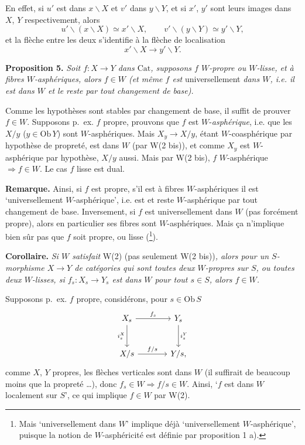 \documentclass[11pt]{article}
\newcommand{\printedpage}[1]{\marginpar{\footnotesize p.~#1}}
\newcommand{\msp}[1]{\marginpar{\footnotesize [#1]}}
\newcommand{\Cat}{\mathrm{Cat}}
\newcommand{\Ob}{\mathrm{Ob}}
\begin{document}
\printedpage{24}
En effet, si $u'$ est dans $x\backslash X$ et $v'$ dans $y\backslash Y$, et si $x'$, $y'$ sont leurs images dans $X$, $Y$ respectivement, alors
\[
u'\backslash(x\backslash X)\simeq x'\backslash X,\qquad v'\backslash(y\backslash Y)\simeq y'\backslash Y,
\]
et la flèche entre les deux s'identifie à la flèche de localisation
\[
x'\backslash X\longrightarrow y'\backslash Y.
\]

\textbf{Proposition 5.} \textit{Soit $f : X\longrightarrow Y$ dans $\Cat$, supposons $f$ $W$-propre ou $W$-lisse, et à fibres $W$-asphériques, alors $f\in W$ (et même $f$ est} \textup{universellement} \textit{dans $W$, i.e. il est dans $W$ et le reste par tout changement de base).}

\leavevmode\msp{page 30}Comme les hypothèses sont stables par changement de base, il suffit de prouver $f\in W$. Supposons p.~ex. $f$ propre, prouvons que $f$ est $W$-\textit{asphérique}, i.e. que les $X/y$ ($y\in\Ob\,Y$) sont $W$-asphériques. Mais $X_y\longrightarrow X/y$, étant $W$-coasphérique par hypothèse de propreté, est dans $W$ (par W(2 bis)), et comme $X_y$ est $W$-asphérique par hypothèse, $X/y$ aussi. Mais par W(2 bis), $f$ $W$-asphérique $\Longrightarrow f\in W$. Le cas $f$ lisse est dual.

\textbf{Remarque.} Ainsi, si $f$ est propre, s'il est à fibres $W$-asphériques il est `universellement $W$-asphérique', i.e. est et reste $W$-asphérique par tout changement de base. Inversement, si $f$ est universellement dans $W$ (pas forcément propre), alors en particulier ses fibres sont $W$-asphériques. Mais ça n'implique bien sûr pas que $f$ soit propre, ou lisse (\footnote[44]{Mais `universellement dans $W$' implique déjà `universellement $W$-asphérique', puisque la notion de $W$-asphéricité est définie par proposition 1 a).}).

\textbf{Corollaire.} \textit{Si $W$ satisfait} \textup{W(2) (pas seulement W(2 bis))}\textit{, alors pour un $S$-morphisme $X\longrightarrow Y$ de catégories qui sont toutes deux $W$-propres sur $S$, ou toutes deux $W$-lisses, si $f_s : X_s\longrightarrow Y_s$ est dans $W$ pour tout $s\in S$, alors $f\in W$.}

\leavevmode\msp{page 31}Supposons p.~ex. $f$ propre, considérons, pour $s\in\Ob\,S$
\[
\begin{tikzcd}[row sep=large, column sep=large]
X_s \arrow[r, "f_s"] \arrow[d, "i_s^X"'] & Y_s \arrow[d, "i_s^Y"] \\
X/s \arrow[r, "f/s"] & Y/s,
\end{tikzcd}
\]
comme $X$, $Y$ propres, les flèches verticales sont dans $W$ (il suffirait de beaucoup moins que la propreté \dots), donc $f_s\in W\Longrightarrow f/s\in W$. Ainsi, `$f$ est dans $W$ localement sur $S$', ce qui implique $f\in W$ par W(2).
\end{document}
